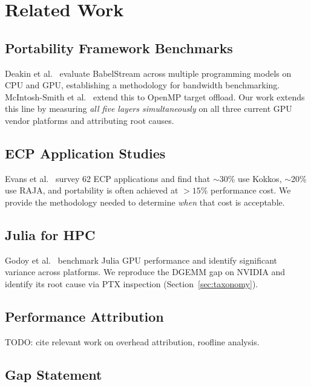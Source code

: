 
\section{Related Work}
\label{sec:related}

\subsection{Portability Framework Benchmarks}

Deakin et al.~\cite{Deakin2019} evaluate BabelStream across multiple programming
models on CPU and GPU, establishing a methodology for bandwidth benchmarking.
McIntosh-Smith et al.~\cite{McIntoshSmith2021} extend this to OpenMP target offload.
Our work extends this line by measuring \emph{all five layers simultaneously} on all
three current GPU vendor platforms and attributing root causes.

\subsection{ECP Application Studies}

Evans et al.~\cite{Evans2022} survey 62 ECP applications and find that $\sim$30\%
use Kokkos, $\sim$20\% use RAJA, and portability is often achieved at $>15\%$
performance cost. We provide the methodology needed to determine \emph{when}
that cost is acceptable.

\subsection{Julia for HPC}

Godoy et al.~\cite{Godoy2023} benchmark Julia GPU performance and identify
significant variance across platforms. We reproduce the DGEMM gap on NVIDIA and
identify its root cause via PTX inspection (Section~\ref{sec:taxonomy}).

\subsection{Performance Attribution}

TODO: cite relevant work on overhead attribution, roofline analysis.

\subsection{Gap Statement}

